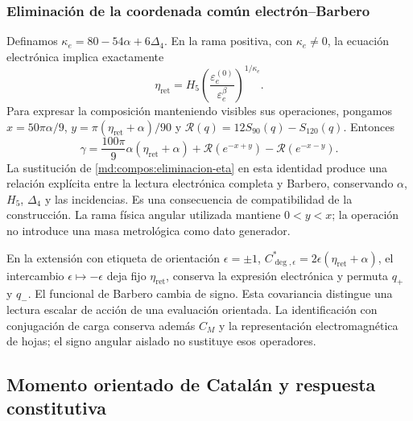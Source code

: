 \subsubsection{Eliminación de la coordenada común electrón--Barbero}
\label{md:compos:eliminacion}

Definamos $\kappa_e=80-54\alpha+6\Delta_4$. En la rama positiva, con
$\kappa_e\neq0$, la ecuación electrónica implica exactamente
\begin{equation}
 \eta_{\mathrm{ret}}=H_5
 \left(\frac{\varepsilon_e^{(0)}}{\varepsilon_e^\beta}\right)^{1/\kappa_e}.
 \label{md:compos:eliminacion-eta}
\end{equation}
Para expresar la composición manteniendo visibles sus operaciones, pongamos
$x=50\pi\alpha/9$, $y=\pi(\eta_{\mathrm{ret}}+\alpha)/90$ y
$\mathcal R(q)=12S_{90}(q)-S_{120}(q)$. Entonces
\begin{equation}
 \gamma=\frac{100\pi}{9}\alpha(\eta_{\mathrm{ret}}+\alpha)
 +\mathcal R(e^{-x+y})-\mathcal R(e^{-x-y}).
 \label{md:compos:barbero-eta}
\end{equation}
La sustitución de \eqref{md:compos:eliminacion-eta} en esta identidad produce
una relación explícita entre la lectura electrónica completa y Barbero,
conservando $\alpha$, $H_5$, $\Delta_4$ y las incidencias. Es una consecuencia
de compatibilidad de la construcción. La rama física angular utilizada
mantiene $0<y<x$; la operación no introduce una masa metrológica como dato
generador.

En la extensión con etiqueta de orientación $\epsilon=\pm1$,
$C^*_{\deg,\epsilon}=2\epsilon(\eta_{\mathrm{ret}}+\alpha)$, el intercambio
$\epsilon\mapsto-\epsilon$ deja fijo $\eta_{\mathrm{ret}}$, conserva la
expresión electrónica y permuta $q_+$ y $q_-$. El funcional de Barbero cambia
de signo. Esta covariancia distingue una lectura escalar de acción de una
evaluación orientada. La identificación con conjugación de carga conserva
además $C_M$ y la representación electromagnética de hojas; el signo angular
aislado no sustituye esos operadores.

\subsection{Momento orientado de Catalán y respuesta constitutiva}
\label{md:compos:catalan}

